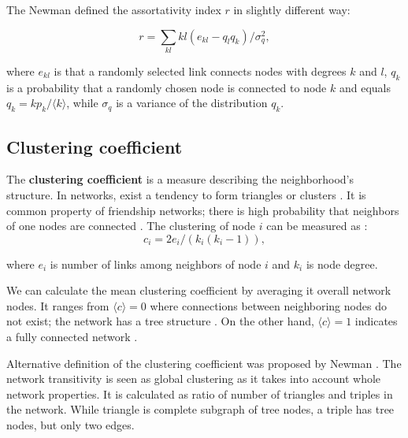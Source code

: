 The Newman defined the assortativity \cite{newman2002assortative} index $r$ in slightly different way:

\begin{equation}
r = \sum_{kl}kl(e_{kl} - q_lq_k) / \sigma_q^2 ,
\end{equation}

where $e_{kl}$ is that a randomly selected link connects nodes with degrees $k$ and $l$, $q_k$ is a probability that a randomly chosen node is connected to node $k$ and equals $q_k = kp_k / \langle k \rangle$, while $\sigma_q$ is a variance of the distribution $q_k$. 

\subsection{Clustering coefficient}

The \textbf{clustering coefficient} is a measure describing the neighborhood's structure. In networks, exist a tendency to form triangles or clusters \cite{barabasi2016network}. It is common property of friendship networks; there is high probability that neighbors of one nodes are connected \cite{mata2020complex}. The clustering of node $i$ can be measured  as \cite{watts1998collective}: 
\begin{equation}
c_i=2e_i/(k_i(k_i-1)),
\end{equation}

where $e_i$ is number of links among neighbors of node $i$ and $k_i$ is node degree. 

We can calculate the mean clustering coefficient by averaging it overall network nodes. It ranges from  $\langle c \rangle = 0$ where connections between neighboring nodes do not exist; the network has a tree structure \cite{barabasi2016network}. On the other hand, $\langle c \rangle = 1$ indicates a fully connected network \cite{barabasi2016network}.

Alternative definition of the clustering coefficient was proposed by Newman \cite{newman2009random}. The network transitivity is seen as global clustering as it takes into account whole network properties. It is calculated as ratio of number of triangles and triples in the network. While triangle is complete subgraph of tree nodes, a triple has tree nodes, but only two edges. 


